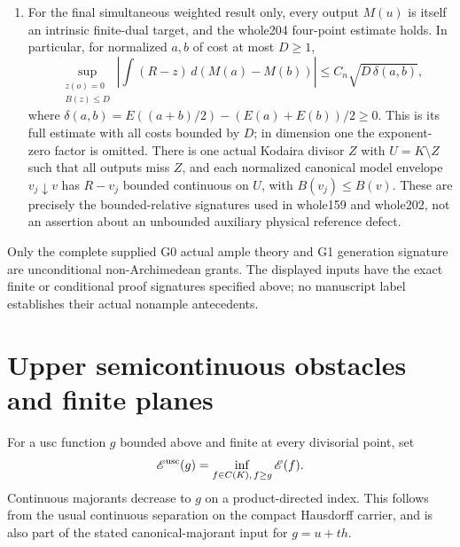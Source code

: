 \documentclass[11pt]{article}
\begin{document}
\begin{enumerate}
\[                                                        \tag{3}
\]
All genuine relative finite-energy tests are $\nu$-integrable.
This is precisely the pre-attainment conditional conclusion
of whole204, whose proof uses whole159 Sections6--8 and
whole202, without its later attained inverse.
\item For the final simultaneous weighted result only, every
output $M(u)$ is itself an intrinsic finite-dual target,
and the whole204 four-point estimate holds. In particular,
for normalized $a,b$ of cost at most $D\geq1$,
\[
 \sup_{\substack{z(o)=0\\B(z)\leq D}}
 \left|\int(R-z)\,d(M(a)-M(b))\right|
       \leq C_n\sqrt{D\,\delta(a,b)},                    \tag{4}
\]
where
$\delta(a,b)=E((a+b)/2)-(E(a)+E(b))/2\geq0$.
This is its full estimate with all costs bounded by $D$;
in dimension one the exponent-zero factor is omitted.
There is one actual Kodaira divisor $Z$ with $U=K\setminus Z$
such that all outputs miss $Z$, and each normalized
canonical model envelope $v_j\downarrow v$ has
$R-v_j$ bounded continuous on $U$, with $B(v_j)\leq B(v)$.
These are precisely the bounded-relative signatures used
in whole159 and whole202, not an assertion about an
unbounded auxiliary physical reference defect.
\end{enumerate}
Only the complete supplied G0 actual ample theory and G1
generation signature are unconditional non-Archimedean grants.
The displayed inputs have the exact finite or conditional proof
signatures specified above; no manuscript label establishes
their actual nonample antecedents.

\section{Upper semicontinuous obstacles and finite planes}
For a usc function $g$ bounded above and finite at every
divisorial point, set
\[
 \mathscr E^{\rm usc}(g)
       =\inf_{f\in C(K),\,f\geq g}\mathscr E(f).
\]
Continuous majorants decrease to $g$ on a product-directed
index. This follows from the usual continuous separation on
the compact Hausdorff carrier, and is also part of the stated
canonical-majorant input for $g=u+th$.
\end{document}
